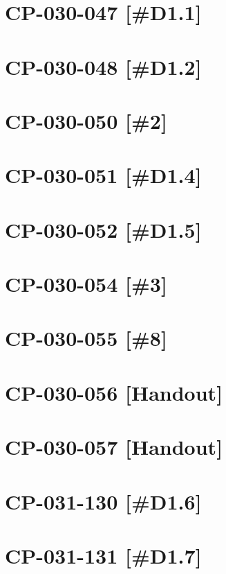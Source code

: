 


\section{CP-030-047 [\#D1.1]}\newpage
\section{CP-030-048 [\#D1.2]}\newpage
\section{CP-030-050 [\#2]}\newpage	
\section{CP-030-051 [\#D1.4]}\newpage

\setcounter{section}{0}

\section{CP-030-052 [\#D1.5]}\newpage	
\section{CP-030-054 [\#3]}\newpage	
\section{CP-030-055 [\#8]}\newpage	
\section{CP-030-056 [Handout]}\newpage	
\section{CP-030-057 [Handout]}\newpage	
\section{CP-031-130 [\#D1.6]}\newpage	
\section{CP-031-131 [\#D1.7]}\newpage

